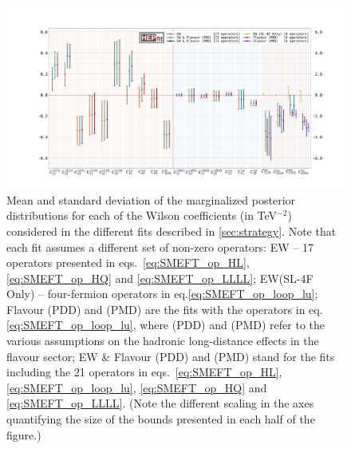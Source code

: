 \begin{figure}
	\centering
	\includegraphics[width=\textwidth]{figures/errorbar.pdf}
	\caption{Mean and standard deviation of the marginalized posterior distributions for each of the Wilson coefficients (in TeV$^{-2}$) considered in the different fits described in \autoref{sec:strategy}.
		Note that each fit assumes a different set of non-zero operators:
		EW -- 17 operators presented in eqs.~\eqref{eq:SMEFT_op_HL}, \eqref{eq:SMEFT_op_HQ} and \eqref{eq:SMEFT_op_LLLL};  EW(SL-4F Only) -- four-fermion operators in eq.\eqref{eq:SMEFT_op_loop_lu}; Flavour (PDD) and (PMD) are the fits with the operators in eq.\eqref{eq:SMEFT_op_loop_lu}, where (PDD) and (PMD) refer to the various assumptions on the hadronic long-distance effects in the flavour sector; EW \& Flavour (PDD) and (PMD) stand for the fits including the 21 operators in eqs.~\eqref{eq:SMEFT_op_HL}, \eqref{eq:SMEFT_op_loop_lu}, \eqref{eq:SMEFT_op_HQ} and \eqref{eq:SMEFT_op_LLLL}. (Note the different scaling in the axes quantifying the size of the bounds presented in each half of the figure.)
	}
	\label{fig:ew_flav_bounds}
\end{figure}
\FloatBarrier

